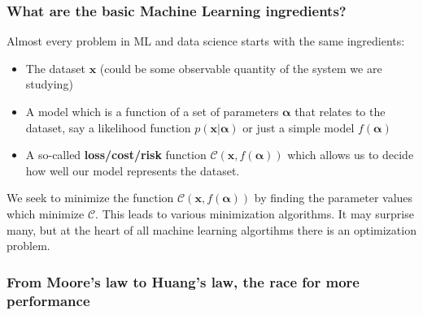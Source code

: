 \documentclass{beamer}
\begin{document}
\begin{frame}
\frametitle{What are the basic Machine Learning ingredients?}

\begin{block}{}
Almost every problem in ML and data science starts with the same ingredients:
\begin{itemize}
\item The dataset $\bm{x}$ (could be some observable quantity of the system we are studying)

\item A model which is a function of a set of parameters $\bm{\alpha}$ that relates to the dataset, say a likelihood  function $p(\bm{x}\vert \bm{\alpha})$ or just a simple model $f(\bm{\alpha})$

\item A so-called \textbf{loss/cost/risk} function $\mathcal{C} (\bm{x}, f(\bm{\alpha}))$ which allows us to decide how well our model represents the dataset. 
\end{itemize}

\noindent
We seek to minimize the function $\mathcal{C} (\bm{x}, f(\bm{\alpha}))$ by finding the parameter values which minimize $\mathcal{C}$. This leads to  various minimization algorithms. It may surprise many, but at the heart of all machine learning algortihms there is an optimization problem. 
\end{block}
\end{frame}



\begin{frame}
\frametitle{From Moore's law to Huang's law, the race for more performance}


\end{frame}
\end{document}
